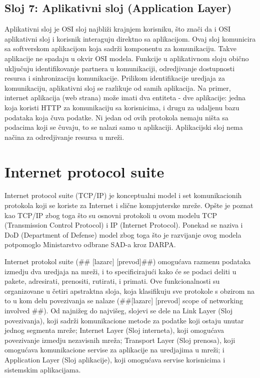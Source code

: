 \documentclass[a4paper,12pt, master]{etf}
\begin{document}
	\subsection{Sloj 7: Aplikativni sloj (Application Layer)}

	Aplikativni sloj je OSI sloj najbli\v{z}i krajnjem korisniku, \v{s}to
	zna\v{c}i da i OSI aplikativni sloj i korisnik interaguju direktno sa
	aplikacijom. Ovaj sloj komunicira sa softverskom aplikacijom koja
	sadr\v{z}i komponentu za komunikaciju. Takve aplikacije ne spadaju u okvir
	OSI modela.	Funkcije u aplikativnom sloju obi\v{c}no uklju\v{c}uju
	identifikovanje partnera u komunikaciji, odredjivanje dostupnosti resursa i
	sinhronizaciju komunikacije. Prilikom identifikacije uredjaja za
	komunikaciju, aplikativni sloj se razlikuje od samih aplikacija. Na primer,
	internet aplikacija (web strana) mo\v{z}e imati dva entiteta - dve
	aplikacije: jedna koja koristi HTTP za komunikaciju sa korisnicima, i drugu
	za udaljenu	bazu podataka koja \v{c}uva podatke. Ni jedan od ovih protokola
	nemaju ni\v{s}ta sa podacima koji se \v{c}uvaju, to se nalazi samo u
	aplikaciji. Aplikacijski sloj nema na\v{c}ina za odredjivanje resursa u
	mre\v{z}i.

	\section{Internet protocol suite}

	Internet protocol suite (TCP/IP) je konceptualni model i set komunikacionih
	protokola koji se koriste za Internet i sli\v{c}ne kompjuterske mre\v{z}e.
	Op\v{s}te je poznat kao TCP/IP zbog toga \v{s}to su osnovni protokoli u
	ovom modelu TCP (Transmission Control Protocol) i IP (Internet Protocol).
	Ponekad se naziva i DoD (Department of Defense) model zbog toga \v{s}to je
	razvijanje ovog modela potpomoglo Ministarstvo odbrane SAD-a kroz DARPA.

	Internet protokol suite (\#\# [lazarc] [prevod]\#\#) omogu\'{c}ava razmenu
	podataka izmedju dva uredjaja na mre\v{z}i, i to specificiraju\'{c}i kako
	\'{c}e se podaci deliti u pakete, adresirati, prenositi, rutirati, i
	primati. Ove funkcionalnosti su organizovane u \v{c}etiri apstraktna sloja,
	koja klasifikuju sve protokole s obzirom na to u kom delu povezivanja se
	nalaze (\#\#[lazarc] [prevod] scope of networking involved \#\#). Od
	najni\v{z}eg do najvi\v{s}eg, slojevi se dele na Link Layer (Sloj
	povezivanja), koji sadr\v{z}i komunikacione metode za podatke koji ostaju
	unutar jednog segmenta mre\v{z}e; Internet Layer (Sloj interneta), koji
	omogu\'{c}ava povezivanje izmedju nezavisnih mre\v{z}a; Transport Layer
	(Sloj prenosa), koji omogu\'{c}ava komunikacione servise za aplikacije na
	uredjajima u mre\v{z}i; i Application Layer	(Sloj aplikacije), koji
	omogu\'{c}ava servise korisnicima i	sistemskim aplikacijama.
\end{document}
